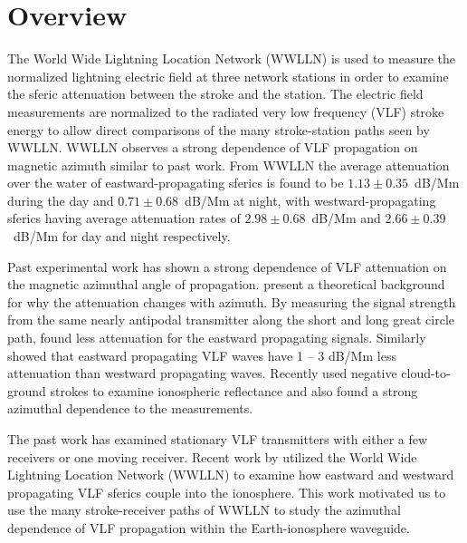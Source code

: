 \section{Overview}


The World Wide Lightning Location Network (WWLLN) is used to measure the normalized lightning electric field at three network stations in order to examine the sferic attenuation between the stroke and the station.
The electric field measurements are normalized to the radiated very low frequency (VLF) stroke energy to allow direct comparisons of the many stroke-station paths seen by WWLLN.
WWLLN observes a strong dependence of VLF propagation on magnetic azimuth similar to past work.
From WWLLN the average attenuation over the water of eastward-propagating sferics is found to be $1.13\pm0.35$~dB/Mm during the day and $0.71\pm0.68$~dB/Mm at night, with westward-propagating sferics having average attenuation rates of $2.98\pm0.68$~dB/Mm and $2.66\pm0.39$~dB/Mm for day and night respectively.



Past experimental work has shown a strong dependence of VLF attenuation on the magnetic azimuthal angle of propagation.
\citet{Wait1960a} present a theoretical background for why the attenuation changes with azimuth.
By measuring the signal strength from the same nearly antipodal transmitter along the short and long great circle path, \citet{Crombie1958} found less attenuation for the eastward propagating signals.
Similarly \citet{Taylor1960a} showed that eastward propagating VLF waves have 1 -- 3 dB/Mm less attenuation than westward propagating waves.
Recently \citet{Jacobson2012} used negative cloud-to-ground strokes to examine ionospheric reflectance and also found a strong azimuthal dependence to the measurements.

The past work has examined stationary VLF transmitters with either a few receivers or one moving receiver.
Recent work by \citet{Burkholder2013} utilized the World Wide Lightning Location Network (WWLLN) to examine how eastward and westward propagating VLF sferics couple into the ionosphere.
This work motivated us to use the many stroke-receiver paths of WWLLN to study the azimuthal dependence of VLF propagation within the Earth-ionosphere waveguide.

